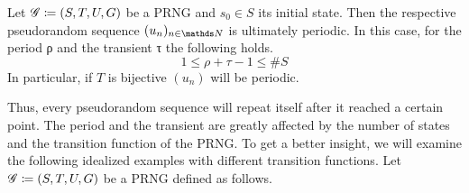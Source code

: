 \documentclass{stdlocal}
\begin{document}
  \begin{lemma}
  \label{lemma:pseudorandom-sequences-periodicity}
    Let $\mathscr{G}\coloneqq (S,T,U,G)$ be a PRNG and $s_0\in S$ its initial state.
    Then the respective pseudorandom sequence $(u_n)_{n\in\setNatural}$ is ultimately periodic.
    In this case, for the period ρ and the transient τ the following holds.
    \[
      1 \leq ρ + τ - 1 \leq \# S
    \]
    In particular, if $T$ is bijective $(u_n)$ will be periodic.
  \end{lemma}
  Thus, every pseudorandom sequence will repeat itself after it reached a certain point.
  The period and the transient are greatly affected by the number of states and the transition function of the PRNG.
  To get a better insight, we will examine the following idealized examples with different transition functions.
  Let $\mathscr{G}\coloneqq (S,T,U,G)$ be a PRNG defined as follows.
\end{document}
